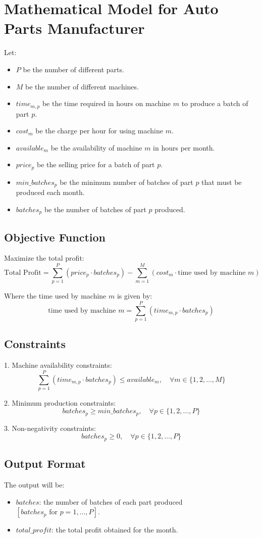 \documentclass{article}
\begin{document}
\section*{Mathematical Model for Auto Parts Manufacturer}

Let:
\begin{itemize}
    \item \( P \) be the number of different parts.
    \item \( M \) be the number of different machines.
    \item \( time_{m,p} \) be the time required in hours on machine \( m \) to produce a batch of part \( p \).
    \item \( cost_{m} \) be the charge per hour for using machine \( m \).
    \item \( available_{m} \) be the availability of machine \( m \) in hours per month.
    \item \( price_{p} \) be the selling price for a batch of part \( p \).
    \item \( min\_batches_{p} \) be the minimum number of batches of part \( p \) that must be produced each month.
    \item \( batches_{p} \) be the number of batches of part \( p \) produced.
\end{itemize}

\subsection*{Objective Function}
Maximize the total profit:
\[
\text{Total Profit} = \sum_{p=1}^{P} (price_{p} \cdot batches_{p}) - \sum_{m=1}^{M} (cost_{m} \cdot \text{time used by machine } m)
\]

Where the time used by machine \( m \) is given by:
\[
\text{time used by machine } m = \sum_{p=1}^{P} (time_{m,p} \cdot batches_{p})
\]

\subsection*{Constraints}
1. Machine availability constraints:
\[
\sum_{p=1}^{P} (time_{m,p} \cdot batches_{p}) \leq available_{m}, \quad \forall m \in \{1, 2, \ldots, M\}
\]

2. Minimum production constraints:
\[
batches_{p} \geq min\_batches_{p}, \quad \forall p \in \{1, 2, \ldots, P\}
\]

3. Non-negativity constraints:
\[
batches_{p} \geq 0, \quad \forall p \in \{1, 2, \ldots, P\}
\]

\subsection*{Output Format}
The output will be:
\begin{itemize}
    \item \( batches \): the number of batches of each part produced \([batches_{p} \text{ for } p = 1, \ldots, P]\).
    \item \( total\_profit \): the total profit obtained for the month.
\end{itemize}
\end{document}
